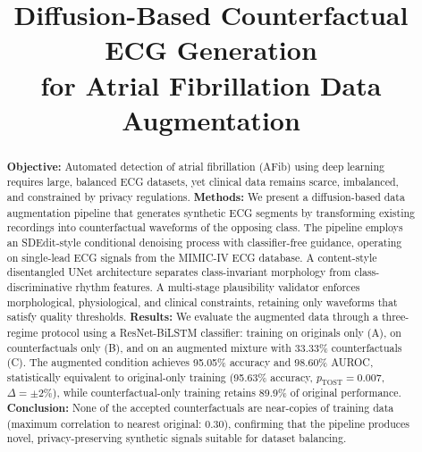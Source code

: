 \documentclass[conference]{IEEEtran}
\begin{document}
\title{Diffusion-Based Counterfactual ECG Generation\\for Atrial Fibrillation Data Augmentation}

\author{
\and
{}
\and
{}
}

\maketitle

\begin{abstract}
\textbf{Objective:} Automated detection of atrial fibrillation (AFib) using deep learning requires large, balanced ECG datasets, yet clinical data remains scarce, imbalanced, and constrained by privacy regulations.
\textbf{Methods:} We present a diffusion-based data augmentation pipeline that generates synthetic ECG segments by transforming existing recordings into counterfactual waveforms of the opposing class. The pipeline employs an SDEdit-style \cite{meng2022sdedit} conditional denoising process with classifier-free guidance, operating on single-lead ECG signals from the MIMIC-IV ECG database. A content-style disentangled UNet architecture separates class-invariant morphology from class-discriminative rhythm features. A multi-stage plausibility validator enforces morphological, physiological, and clinical constraints, retaining only waveforms that satisfy quality thresholds.
\textbf{Results:} We evaluate the augmented data through a three-regime protocol using a ResNet-BiLSTM classifier: training on originals only (A), on counterfactuals only (B), and on an augmented mixture with 33.33\% counterfactuals (C). The augmented condition achieves 95.05\% accuracy and 98.60\% AUROC, statistically equivalent to original-only training (95.63\% accuracy, $p_{\text{TOST}}=0.007$, $\Delta=\pm2\%$), while counterfactual-only training retains 89.9\% of original performance.
\textbf{Conclusion:} None of the accepted counterfactuals are near-copies of training data (maximum correlation to nearest original: 0.30), confirming that the pipeline produces novel, privacy-preserving synthetic signals suitable for dataset balancing.
\end{abstract}
\end{document}
